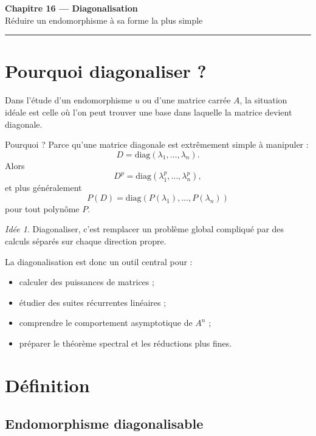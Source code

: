\documentclass[11pt,a4paper]{article}
\theoremstyle{remark}
\newtheorem*{idee}{Idée}
\newcommand{\diag}{\mathrm{diag}}
\begin{document}
\begin{center}
    {\LARGE \textbf{Chapitre 16 --- Diagonalisation}}\\[0.4em]
    {\large Réduire un endomorphisme à sa forme la plus simple}
\end{center}

\hrule
\vspace{1em}

\tableofcontents

\newpage

\section{Pourquoi diagonaliser ?}

Dans l’étude d’un endomorphisme \(u\) ou d’une matrice carrée \(A\), la situation idéale est celle où l’on peut trouver une base dans laquelle la matrice devient diagonale.

Pourquoi ? Parce qu’une matrice diagonale est extrêmement simple à manipuler :
\[
D=
\diag(\lambda_1,\dots,\lambda_n).
\]
Alors
\[
D^p=\diag(\lambda_1^p,\dots,\lambda_n^p),
\]
et plus généralement
\[
P(D)=\diag(P(\lambda_1),\dots,P(\lambda_n))
\]
pour tout polynôme \(P\).

\begin{idee}
Diagonaliser, c’est remplacer un problème global compliqué par des calculs séparés sur chaque direction propre.
\end{idee}

La diagonalisation est donc un outil central pour :
\begin{itemize}
    \item calculer des puissances de matrices ;
    \item étudier des suites récurrentes linéaires ;
    \item comprendre le comportement asymptotique de \(A^n\) ;
    \item préparer le théorème spectral et les réductions plus fines.
\end{itemize}

\section{Définition}

\subsection{Endomorphisme diagonalisable}
\end{document}
